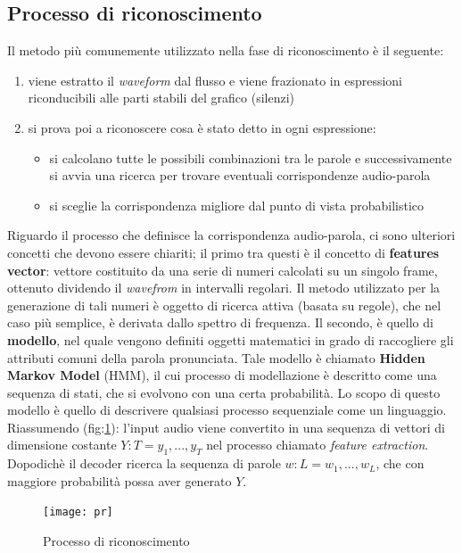 \documentclass[12pt]{article}
\begin{document}
    \subsection{Processo di riconoscimento}    
    Il metodo più comunemente utilizzato nella fase di riconoscimento è il seguente:
    \begin{enumerate}
        \item viene estratto il \textit{waveform} dal flusso e viene frazionato in espressioni riconducibili alle parti stabili del grafico (silenzi)
        \item si prova poi a riconoscere cosa è stato detto in ogni espressione:
            \begin{itemize}         
                \item si calcolano tutte le possibili combinazioni tra le parole e successivamente si avvia una ricerca per trovare eventuali corrispondenze audio-parola
                \item si sceglie la corrispondenza migliore dal punto di vista probabilistico 
            \end{itemize}
    \end{enumerate}
    
    Riguardo il processo che definisce la corrispondenza audio-parola, ci sono ulteriori concetti che devono essere chiariti; il primo tra questi è il concetto di \textbf{features vector}: vettore costituito da una serie di numeri calcolati su un singolo frame, ottenuto dividendo il \textit{wavefrom} in intervalli regolari.
    Il metodo utilizzato per la generazione di tali numeri è oggetto di ricerca attiva (basata su regole), che nel caso più semplice, è derivata dallo spettro di frequenza. Il secondo, è quello di \textbf{modello}, nel quale vengono definiti oggetti matematici in grado di raccogliere gli attributi comuni della parola pronunciata. Tale modello  è chiamato \textbf{Hidden Markov Model} (HMM), il cui processo di modellazione è descritto come una sequenza di stati, che si evolvono con una certa probabilità. Lo scopo di questo modello è quello di descrivere qualsiasi processo sequenziale come un linguaggio.\\
    Riassumendo  (fig:\ref{fig:second}): l'input audio viene convertito in una sequenza di vettori di dimensione costante $Y:T = y_1,...,y_T$ nel processo chiamato \textit{feature extraction}. Dopodichè il decoder ricerca la sequenza di parole $w:L = w_1,...,w_L$, che con maggiore probabilità possa aver generato $Y$.
      \begin{figure}
            \centering
            \texttt{[image: pr]}
            \caption{Processo di riconoscimento}
            \label{fig:second}
     \end{figure} 
\end{document}

